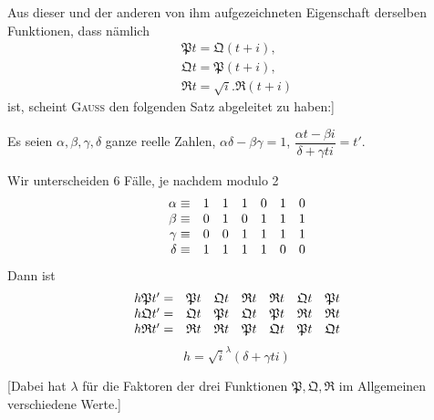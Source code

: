 Aus dieser und der anderen von ihm aufgezeichneten Eigenschaft derselben Funktionen, dass nämlich
\[
\begin{gathered}\mathfrak{P}t=\mathfrak{Q}(t+i),\\[5pt]
\mathfrak{Q}t=\mathfrak{P}(t+i),\\[5pt]
\mathfrak{R}t=\surd i.\mathfrak{R}(t+i)\end{gathered}
\]
ist, scheint \textsc{Gauss} den folgenden Satz abgeleitet zu haben:]

\begin{itshape}
Es seien $\alpha,\allowbreak \beta,\allowbreak \gamma,\allowbreak \delta$ ganze reelle Zahlen, $\alpha\delta-\beta\gamma=1$,
$\dfrac{\alpha t-\beta i}{\delta+\gamma ti}=t'$.

Wir unterscheiden 6 Fälle, je nachdem modulo 2
\[
\begin{array}{r@{\;}c@{\quad}cccccc}
\alpha&\equiv&1&1&1&0&1&0\\
\beta&\equiv&0&1&0&1&1&1\\
\gamma&\equiv&0&0&1&1&1&1\\
\delta&\equiv&1&1&1&1&0&0
\end{array}
\]
Dann ist
\[
\begin{array}{r@{\;}c@{\quad}cccccc}
h\mathfrak{P}t'&=&\mathfrak{P}t&\mathfrak{Q}t&\mathfrak{R}t&\mathfrak{R}t&\mathfrak{Q}t&\mathfrak{P}t\\
h\mathfrak{Q}t'&=&\mathfrak{Q}t&\mathfrak{P}t&\mathfrak{Q}t&\mathfrak{P}t&\mathfrak{R}t&\mathfrak{R}t\\
h\mathfrak{R}t'&=&\mathfrak{R}t&\mathfrak{R}t&\mathfrak{P}t&\mathfrak{Q}t&\mathfrak{P}t&\mathfrak{Q}t
\end{array}
\]
\[
h=\surd i^\lambda(\delta+\gamma ti)
\]
\end{itshape}

[Dabei hat $\lambda$ für die Faktoren der drei Funktionen $\mathfrak{P},\allowbreak \mathfrak{Q},\allowbreak \mathfrak{R}$ im Allgemeinen verschiedene Werte.]

